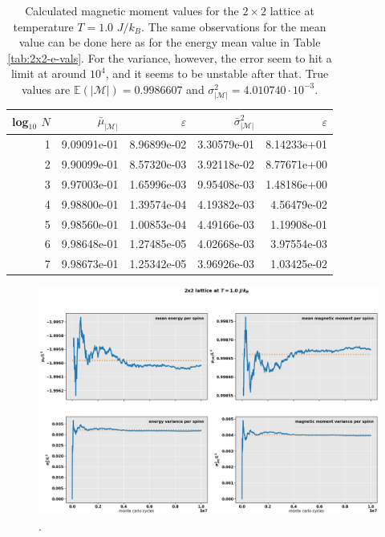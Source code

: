 \documentclass[]{article}
\begin{document}
\begin{table}[!h]
	\caption{Calculated magnetic moment values for the $2 \times 2$ lattice at temperature $T=1.0$ $J/k_B$. The same observations for the mean value can be done here as for the energy mean value in Table \ref{tab:2x2-e-vals}. For the variance, however, the error seem to hit a limit at around $10^4$, and it seems to be unstable after that. True values are $\mathbb{E}(|\mathcal{M}|) = 0.9986607$ and $\sigma_{|\mathcal{M}|}^2 = 4.010740 \cdot 10^{-3}$.}
	\label{tab:2x2-m-vals}
	\begin{center}
		\begin{tabular}{r|rr|rr}
			\toprule
			log$_{10}$ $N$ & $\bar{\mu}_{|\mathcal{M}|}$ & $\varepsilon$ & $\bar{\sigma}^2_{|\mathcal{M}|}$ & $\varepsilon$ \\
			\midrule
			1 & 9.09091e-01 & 8.96899e-02 & 3.30579e-01 & 8.14233e+01 \\
			2 & 9.90099e-01 & 8.57320e-03 & 3.92118e-02 & 8.77671e+00 \\
			3 & 9.97003e-01 & 1.65996e-03 & 9.95408e-03 & 1.48186e+00 \\
			4 & 9.98800e-01 & 1.39574e-04 & 4.19382e-03 & 4.56479e-02 \\
			5 & 9.98560e-01 & 1.00853e-04 & 4.49166e-03 & 1.19908e-01 \\
			6 & 9.98648e-01 & 1.27485e-05 & 4.02668e-03 & 3.97554e-03 \\
			7 & 9.98673e-01 & 1.25342e-05 & 3.96926e-03 & 1.03425e-02 \\
			\bottomrule
		\end{tabular}
	\end{center}
\end{table}

\begin{figure}[!h]
	\centering
	\includegraphics[width=1\linewidth]{./figs/2x2.png}
	\caption{.}
	\label{fig:2x2}
\end{figure}
\end{document}
